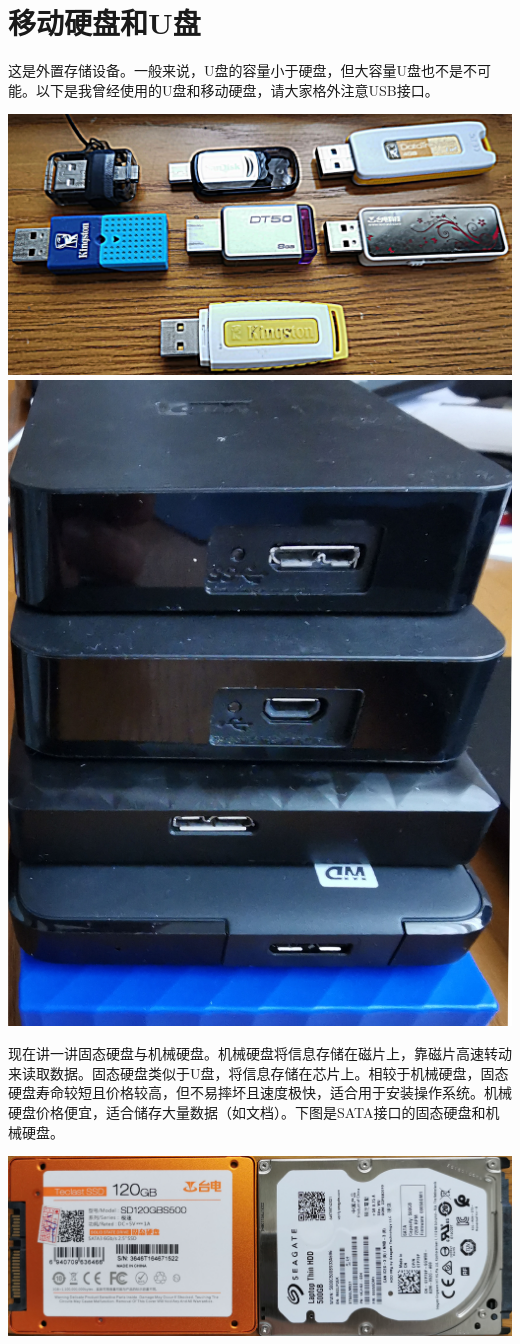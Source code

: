 \section{移动硬盘和U盘}
这是外置存储设备。一般来说，U盘的容量小于硬盘，但大容量U盘也不是不可能。以下是我曾经使用的U盘和移动硬盘，请大家格外注意USB接口。
\begin{center}
	\includegraphics[width=0.7\linewidth]{pic/FlashDisk1}	\\\includegraphics[width=0.7\linewidth]{pic/FlashDisk2}
\end{center} \par
现在讲一讲固态硬盘与机械硬盘。机械硬盘将信息存储在磁片上，靠磁片高速转动来读取数据。固态硬盘类似于U盘，将信息存储在芯片上。相较于机械硬盘，固态硬盘寿命较短且价格较高，但不易摔坏且速度极快，适合用于安装操作系统。机械硬盘价格便宜，适合储存大量数据（如文档）。下图是SATA接口的固态硬盘和机械硬盘。
\begin{center}
	\includegraphics[width=0.7\linewidth]{pic/HD}
\end{center} 
